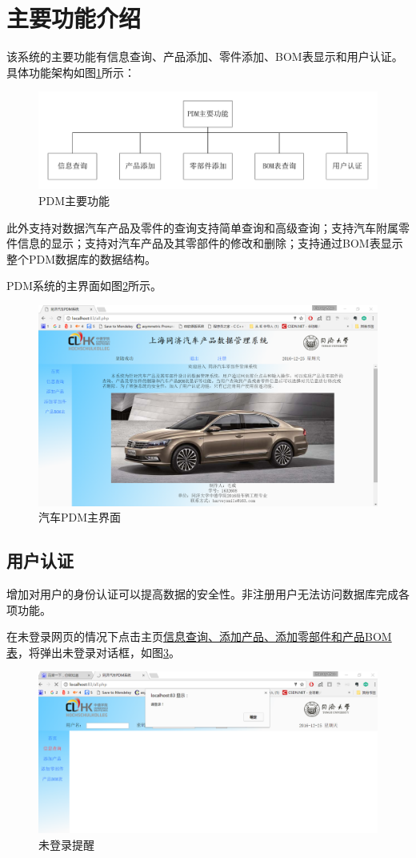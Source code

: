 \section{主要功能介绍}
该系统的主要功能有信息查询、产品添加、零件添加、BOM表显示和用户认证。具体功能架构如图\ref{fig:function}所示：
\begin{figure}[H]
\centering
\includegraphics[width=0.9\linewidth]{figure/function.pdf}
\caption{PDM主要功能}
\label{fig:function}
\end{figure}

此外支持对数据汽车产品及零件的查询支持简单查询和高级查询；支持汽车附属零件信息的显示；支持对汽车产品及其零部件的修改和删除；支持通过BOM表显示整个PDM数据库的数据结构。

PDM系统的主界面如图\ref{fig:index1}所示。
\begin{figure}[H]
\centering
\includegraphics[width=0.9\linewidth]{figure/index}
\caption{汽车PDM主界面}
\label{fig:index1}
\end{figure}

\subsection{用户认证}
增加对用户的身份认证可以提高数据的安全性。非注册用户无法访问数据库完成各项功能。

在未登录网页的情况下点击主页\underline{信息查询、添加产品、添加零部件和产品BOM表}，将弹出未登录对话框，如图\ref{fig:nologin}。
\begin{figure}[H]
\centering
\includegraphics[width=0.9\linewidth]{figure/nologin}
\caption{未登录提醒}
\label{fig:nologin}
\end{figure}

